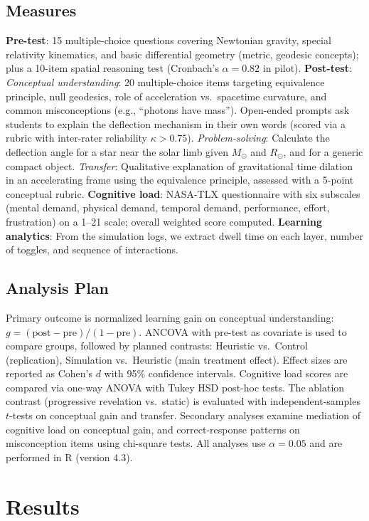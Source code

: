 \documentclass{article}
\begin{document}
\begin{itemize}
\subsection{Measures}
\textbf{Pre-test}: 15 multiple-choice questions covering Newtonian gravity, special relativity kinematics, and basic differential geometry (metric, geodesic concepts); plus a 10-item spatial reasoning test (Cronbach's $\alpha=0.82$ in pilot).  
\textbf{Post-test}:  
\textit{Conceptual understanding}: 20 multiple-choice items targeting equivalence principle, null geodesics, role of acceleration vs.\ spacetime curvature, and common misconceptions (e.g., ``photons have mass''). Open-ended prompts ask students to explain the deflection mechanism in their own words (scored via a rubric with inter-rater reliability $\kappa>0.75$).  
\textit{Problem-solving}: Calculate the deflection angle for a star near the solar limb given $M_\odot$ and $R_\odot$, and for a generic compact object.  
\textit{Transfer}: Qualitative explanation of gravitational time dilation in an accelerating frame using the equivalence principle, assessed with a 5-point conceptual rubric.  
\textbf{Cognitive load}: NASA-TLX questionnaire with six subscales (mental demand, physical demand, temporal demand, performance, effort, frustration) on a 1--21 scale; overall weighted score computed.  
\textbf{Learning analytics}: From the simulation logs, we extract dwell time on each layer, number of toggles, and sequence of interactions.

\subsection{Analysis Plan}
Primary outcome is normalized learning gain on conceptual understanding: $g = (\mathrm{post} - \mathrm{pre})/(1 - \mathrm{pre})$. ANCOVA with pre-test as covariate is used to compare groups, followed by planned contrasts: Heuristic vs.\ Control (replication), Simulation vs.\ Heuristic (main treatment effect). Effect sizes are reported as Cohen's $d$ with 95\% confidence intervals. Cognitive load scores are compared via one-way ANOVA with Tukey HSD post-hoc tests. The ablation contrast (progressive revelation vs.\ static) is evaluated with independent-samples $t$-tests on conceptual gain and transfer. Secondary analyses examine mediation of cognitive load on conceptual gain, and correct-response patterns on misconception items using chi-square tests. All analyses use $\alpha=0.05$ and are performed in R (version 4.3).

\section{Results}


\end{itemize}
\end{document}
